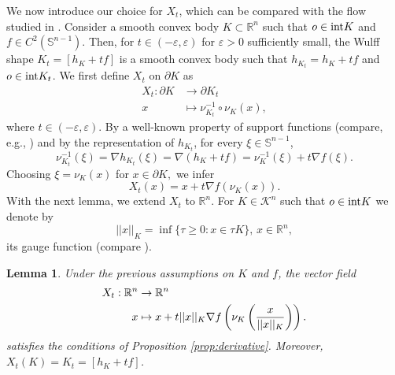 \documentclass[a4paper, 11pt]{article}
\newcommand{\R}{\mathbb{R}}
\newcommand{\sph}{\mathbb{S}}
\newcommand{\K}{\mathcal{K}}
\newtheorem{lemma}[theorem]{Lemma}
\theoremstyle{definition}
\begin{document}
We now introduce our choice for $X_t$, which can be compared with the flow studied in \cite[Section 6.2.3]{Kol_Mil_P}. Consider a smooth convex body $K \subset \R^n$ such that $o \in {\rm int} K$ and $f \in C^2(\sph^{n-1})$. Then, for $t \in (-\varepsilon,\varepsilon)$ for $\varepsilon>0$ sufficiently small, the Wulff shape $K_t=[h_K+tf]$ is a smooth convex body such that $h_{K_t}=h_K+tf$ and $o \in {\rm int}K_t$. We first define $X_t$ on $\partial K$ as
\begin{align*}
    X_t : \partial K &\to \partial K_t \\
    x &\mapsto \nu^{-1}_{K_t}\circ \nu_K(x),
\end{align*}
where $t \in (-\varepsilon,\varepsilon)$. By a well-known property of support functions (compare, e.g., \cite[Corollary 1.7.3]{SchneiderConvexBodiesBrunn2013}) and by the representation of $h_{K_t}$, for every $\xi \in \sph^{n-1}$, \[ \nu^{-1}_{K_t}(\xi)= \nabla h_{K_t}(\xi)=\nabla (h_K+tf)=\nu^{-1}_K(\xi)+t\nabla f(\xi).\] Choosing $\xi=\nu_K(x)$ for $x \in \partial K,$ we infer \[ X_t(x)=x+t \nabla f(\nu_K(x)).\] 
With the next lemma, we extend $X_t$ to $\R^n$. For $K \in \K^n$ such that $o \in {\rm int}K$ we denote by \[ ||x||_K=\inf\{\tau \geq 0 : x \in \tau K \}, \, x \in \R^n,\] its gauge function (compare \cite[Section 1.7]{SchneiderConvexBodiesBrunn2013}).
\begin{lemma}\label{lemma:malaka_vector_field}
    Under the previous assumptions on $K$ and $f$, the vector field 
    \begin{align*}
        X_t: \R^n &\to \R^n \label{eq:vector_field}\\
    x &\mapsto x+ t||x||_K\nabla f\left( \nu_K\left( \frac{x}{||x||_K} \right) \right). 
    \notag
    \end{align*}
    satisfies the conditions of Proposition \ref{prop:derivative}. Moreover, $X_t(K)=K_t=[h_K+tf]$.
\end{lemma}
\end{document}
